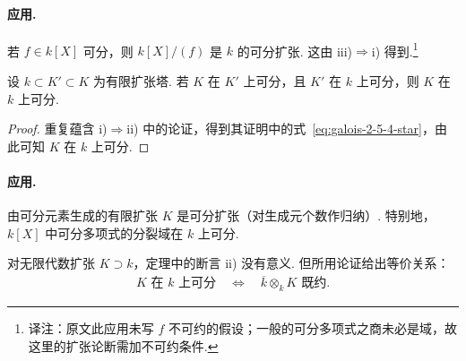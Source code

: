 \paragraph{应用.}
若 $f\in k[X]$ 可分，则 $k[X]/(f)$ 是 $k$ 的可分扩张. 这由 iii)$\Rightarrow$i) 得到.\footnote{译注：原文此应用未写 $f$ 不可约的假设；一般的可分多项式之商未必是域，故这里的扩张论断需加不可约条件.}
\begin{corollary*}[{由证明得到}]
设 $k\subset K'\subset K$ 为有限扩张塔. 若 $K$ 在 $K'$ 上可分，且 $K'$ 在 $k$ 上可分，则 $K$ 在 $k$ 上可分.
\end{corollary*}
\begin{proof}
重复蕴含 i)$\Rightarrow$ii) 中的论证，得到其证明中的式~\eqref{eq:galois-2-5-4-star}，由此可知 $K$ 在 $k$ 上可分.
\end{proof}
\paragraph{应用.}
由可分元素生成的有限扩张 $K$ 是可分扩张（对生成元个数作归纳）. 特别地，$k[X]$ 中可分多项式的分裂域在 $k$ 上可分.
\begin{remark*}
对无限代数扩张 $K\supset k$，定理中的断言 ii) 没有意义. 但所用论证给出等价关系：
\begin{align*}
K\text{ 在 }k\text{ 上可分}\quad\Longleftrightarrow\quad\overline k\otimes_k K\text{ 既约}.
\end{align*}
\end{remark*}
